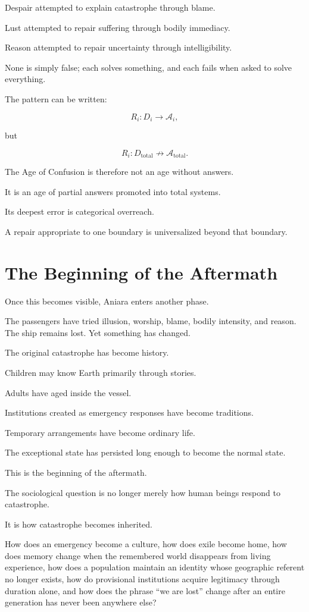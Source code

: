 \documentclass[11pt,oneside]{book}
\theoremstyle{definition}
\theoremstyle{remark}
\newcommand{\A}{\mathcal{A}}
\begin{document}
Despair attempted to explain catastrophe through blame.

Lust attempted to repair suffering through bodily immediacy.

Reason attempted to repair uncertainty through intelligibility.

None is simply false; each solves something, and each fails when asked to solve everything.

The pattern can be written:

\[
R_i:
D_i\rightarrow\A_i,
\]

but

\[
R_i:
D_{\mathrm{total}}
\not\rightarrow
\A_{\mathrm{total}}.
\]

The Age of Confusion is therefore not an age without answers.

It is an age of partial answers promoted into total systems.

Its deepest error is categorical overreach.

A repair appropriate to one boundary is universalized beyond that boundary.

\section{The Beginning of the Aftermath}

Once this becomes visible, Aniara enters another phase.

The passengers have tried illusion, worship, blame, bodily intensity, and reason. The ship remains lost. Yet something has changed.

The original catastrophe has become history.

Children may know Earth primarily through stories.

Adults have aged inside the vessel.

Institutions created as emergency responses have become traditions.

Temporary arrangements have become ordinary life.

The exceptional state has persisted long enough to become the normal state.

This is the beginning of the aftermath.

The sociological question is no longer merely how human beings respond to catastrophe.

It is how catastrophe becomes inherited.

How does an emergency become a culture, how does exile become home, how does memory change when the remembered world disappears from living experience, how does a population maintain an identity whose geographic referent no longer exists, how do provisional institutions acquire legitimacy through duration alone, and how does the phrase ``we are lost'' change after an entire generation has never been anywhere else?
\end{document}
